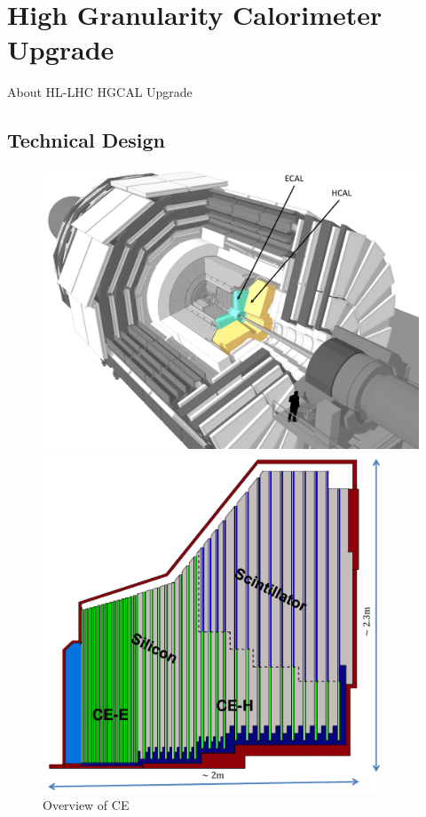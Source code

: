 \chapter{
  High Granularity Calorimeter Upgrade
 }\label{ch_hgcal}

About \gls{HL-LHC} \gls{HGCAL} Upgrade

\section{
  Technical Design
 }

\begin{figure}[!ht]
  \centering
  \begin{minipage}[c]{0.49\textwidth}
    \includegraphics[width=\textwidth]{figures/hgcal/hgcal_place.pdf}
  \end{minipage}
  \begin{minipage}[c]{0.49\textwidth}
    \includegraphics[width=0.9\textwidth]{figures/hgcal/hgcal_quadrant.pdf}
  \end{minipage}
  \caption[Overview of CE]%
  {Overview of CE~\cite{image-cms-hgcal-quadrant-layout,image-cms-hgcal-place}}%
  \label{fig:cms-hgcal-quadrant-layout}
\end{figure}

